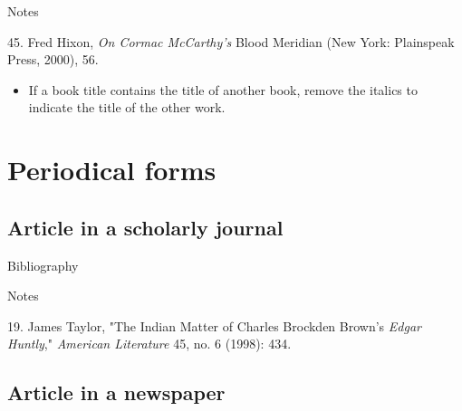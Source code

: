 \begin{center}{Notes}\end{center} 

\begin{singlespace}\noindent\hspace{1.2cm}45. Fred Hixon,
\emph{On Cormac McCarthy's} Blood Meridian (New York: Plainspeak Press, 2000),
56.
\end{singlespace}

\begin{itemize}\item If a book title contains the title of another book, remove
the italics to indicate the title of the other work.\end{itemize}


\section{Periodical forms}

\subsection{Article in a scholarly journal}

\begin{center}{Bibliography}\end{center} 

\begin{singlespace}
\noindent{}
\end{singlespace}


\begin{center}{Notes}\end{center} 

\begin{singlespace}
\noindent\hspace{1.2cm}19. James Taylor, "The
Indian Matter of Charles Brockden Brown's \emph{Edgar Huntly}," \emph{American
Literature} 45, no. 6 (1998): 434.
\end{singlespace}

\subsection{Article in a newspaper}

